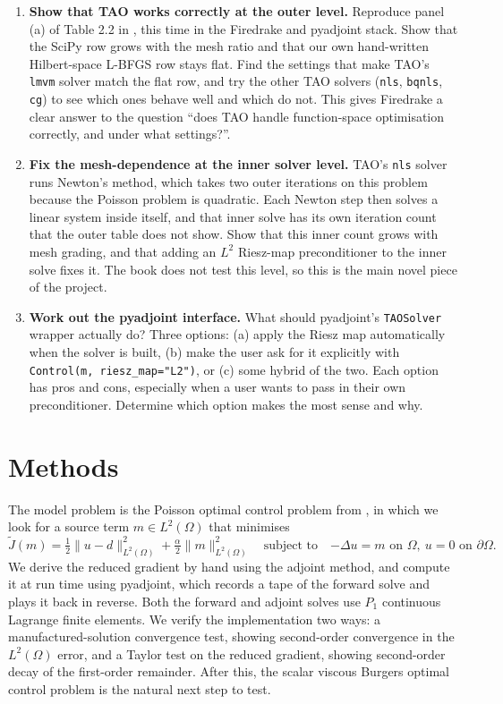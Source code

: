 \documentclass[a4paper,11pt]{article}
\newcommand{\Om}{\Omega}
\newcommand{\Lp}[1]{L^{2}(#1)}
\newcommand{\Jt}{\tilde{J}}
\begin{document}
\begin{enumerate}
\setlength{\itemsep}{2pt}
  \item \textbf{Show that TAO works correctly at the outer level.} Reproduce panel (a) of Table 2.2 in \citet{shfp2017}, this time in the Firedrake and pyadjoint stack. Show that the SciPy row grows with the mesh ratio and that our own hand-written Hilbert-space L-BFGS row stays flat. Find the settings that make TAO's \texttt{lmvm} solver match the flat row, and try the other TAO solvers (\texttt{nls}, \texttt{bqnls}, \texttt{cg}) to see which ones behave well and which do not. This gives Firedrake a clear answer to the question ``does TAO handle function-space optimisation correctly, and under what settings?''.
  \item \textbf{Fix the mesh-dependence at the inner solver level.} TAO's \texttt{nls} solver runs Newton's method, which takes two outer iterations on this problem because the Poisson problem is quadratic. Each Newton step then solves a linear system inside itself, and that inner solve has its own iteration count that the outer table does not show. Show that this inner count grows with mesh grading, and that adding an $L^{2}$ Riesz-map preconditioner to the inner solve fixes it. The book does not test this level, so this is the main novel piece of the project.
  \item \textbf{Work out the pyadjoint interface.} What should pyadjoint's \texttt{TAOSolver} wrapper actually do? Three options: (a) apply the Riesz map automatically when the solver is built, (b) make the user ask for it explicitly with \texttt{Control(m, riesz\_map="L2")}, or (c) some hybrid of the two. Each option has pros and cons, especially when a user wants to pass in their own preconditioner. Determine which option makes the most sense and why.
\end{enumerate}

\section{Methods}

The model problem is the Poisson optimal control problem from \citet[Sect. 1.6]{shfp2017}, in which we look for a source term $m \in \Lp{\Om}$ that minimises
\[
    \Jt(m) = \tfrac{1}{2} \|u - d\|_{\Lp{\Om}}^{2}
      + \tfrac{\alpha}{2} \|m\|_{\Lp{\Om}}^{2}
    \quad
    \text{subject to} \quad {-\Delta u = m} \text{ on } \Om,\ u = 0 \text{ on } \partial\Om.
\]
We derive the reduced gradient by hand using the adjoint method, and compute it at run time using pyadjoint, which records a tape of the forward solve and plays it back in reverse. Both the forward and adjoint solves use $P_{1}$ continuous Lagrange finite elements. We verify the implementation two ways: a manufactured-solution convergence test, showing second-order convergence in the $\Lp{\Om}$ error, and a Taylor test on the reduced gradient, showing second-order decay of the first-order remainder. After this, the scalar viscous Burgers optimal control problem is the natural next step to test.
\end{document}
